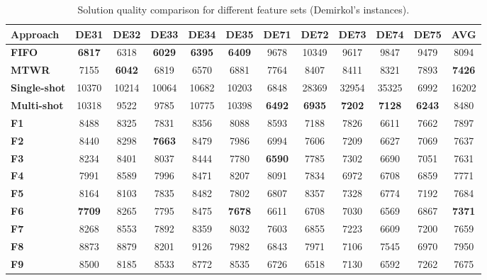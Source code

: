 \documentclass[runningheads]{llncs}
\begin{document}
\begin{table}[bt]
  \begin{center}
    \caption{Solution quality comparison for different feature sets (Demirkol's instances).}
    \label{tab5}
    \addtolength{\tabcolsep}{0.9pt}
    \begin{tabular}{|l|c|c|c|c|c|c|c|c|c|c|c|} \hline
      \textbf{Approach}  & DE31  & DE32 & DE33 & DE34 & DE35 & DE71 & DE72 & DE73 & DE74 & DE75 & AVG  \\ \hline

      \textbf{FIFO}  & \textbf{6817} & 6318 & \textbf{6029} & \textbf{6395} & \textbf{6409} & 9678 & 10349 & 9617 & 9847 & 9479 & 8094 \\
      \textbf{MTWR}  & 7155 & \textbf{6042} & 6819 & 6570 & 6881 & 7764 & 8407 & 8411 & 8321 & 7893 & \textbf{7426} \\
      \textbf{Single-shot} & 10370 & 10214 & 10064 & 10682 & 10203 & 6848 & 28369 & 32954 & 35325 & 6992 & 16202 \\
      \textbf{Multi-shot} & 10318  & 9522  & 9785 & 10775 & 10398 & \textbf{6492}  & \textbf{6935} & \textbf{7202} & \textbf{7128}  & \textbf{6243} & 8480 \\ \hline
      \textbf{F1}  & 8488  & 8325  & 7831 & 8356 & 8088 & 8593  & 7188 & 7826 & 6611 & 7662 & 7897 \\
      \textbf{F2}  & 8440  & 8298  & \textbf{7663} & 8479 & 7986 & 6994  & 7606 & 7209 & 6627 & 7069 & 7637 \\
      \textbf{F3}  & 8234  & 8401  & 8037 & 8444 & 7780 & \textbf{6590}  & 7785 & 7302 & 6690 & 7051 & 7631 \\
      \textbf{F4}  & 7991  & 8589  & 7996 & 8471 & 8207 & 8091  & 7834 & 6972 & 6708 & 6859 & 7771 \\
      \textbf{F5}  & 8164  & 8103  & 7835 & 8482 & 7802 & 6807  & 8357 & 7328 & 6774 & 7192 & 7684\\
      \textbf{F6}  & \textbf{7709} & 8265 & 7795 & 8475 & \textbf{7678}  & 6611 & 6708 & 7030 &6569 & 6867 & \textbf{7371} \\
      \textbf{F7}  & 8268  & 8553  & 7892 & 8359 & 8032 & 7603  & 6855 & 7223 & 6609 & 7200 & 7659 \\
      \textbf{F8}  & 8873 & 8879 & 8201 & 9126 & 7982 & 6843 & 7971 & 7106 & 7545 & 6970 & 7950 \\
      \textbf{F9}  & 8500  & 8185  & 8533 & 8772 & 8535 & 6726 & 6518& 7130 & 6592 & 7262 & 7675 \\

\end{tabular}
\end{center}
\end{table}
\end{document}
